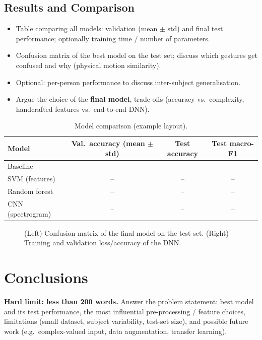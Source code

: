 \documentclass[10pt,a4paper,titlepage]{article}
\newcommand{\placeholder}[1]{\begin{placeholderbox}#1\end{placeholderbox}}
\begin{document}
\subsection{Results and Comparison}
\placeholder{%
\begin{itemize}
  \item Table comparing all models: validation (mean $\pm$ std) and final test
        performance; optionally training time / number of parameters.
  \item Confusion matrix of the best model on the test set; discuss which
        gestures get confused and why (physical motion similarity).
  \item Optional: per-person performance to discuss inter-subject
        generalisation.
  \item Argue the choice of the \textbf{final model}, trade-offs (accuracy vs.\
        complexity, handcrafted features vs.\ end-to-end DNN).
\end{itemize}}

\begin{table}[h]
  \centering
  \caption{Model comparison (example layout).}
  \label{tab:results}
  \begin{tabular}{@{}lccc@{}}
    \toprule
    Model & Val.\ accuracy (mean $\pm$ std) & Test accuracy & Test macro-F1 \\
    \midrule
    Baseline        & -- & -- & -- \\
    SVM (features)  & -- & -- & -- \\
    Random forest   & -- & -- & -- \\
    CNN (spectrogram) & -- & -- & -- \\
    \bottomrule
  \end{tabular}
\end{table}

\begin{figure}[h]
  \centering
  \hfill
  \caption{(Left) Confusion matrix of the final model on the test set.
    (Right) Training and validation loss/accuracy of the DNN.}
  \label{fig:results}
\end{figure}

\section{Conclusions}
\label{sec:conclusions}
\placeholder{%
\textbf{Hard limit: less than 200 words.} Answer the problem statement:
best model and its test performance, the most influential pre-processing /
feature choices, limitations (small dataset, subject variability, test-set
size), and possible future work (e.g.\ complex-valued input, data augmentation,
transfer learning).}
\end{document}
